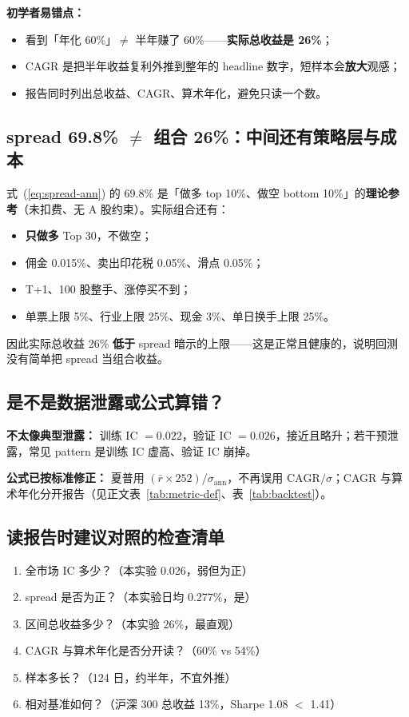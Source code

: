 \documentclass[UTF8,a4paper,12pt]{ctexart}
\begin{document}
\textbf{初学者易错点：}
\begin{itemize}[leftmargin=2em]
  \item 看到「年化 60\%」$\neq$ 半年赚了 60\%——\textbf{实际总收益是 26\%}；
  \item CAGR 是把半年收益复利外推到整年的 headline 数字，短样本会\textbf{放大}观感；
  \item 报告同时列出总收益、CAGR、算术年化，避免只读一个数。
\end{itemize}

\subsection{spread 69.8\% $\neq$ 组合 26\%：中间还有策略层与成本}

式~(\ref{eq:spread-ann}) 的 69.8\% 是「做多 top 10\%、做空 bottom 10\%」的\textbf{理论参考}（未扣费、无 A 股约束）。实际组合还有：

\begin{itemize}[leftmargin=2em]
  \item \textbf{只做多} Top 30，不做空；
  \item 佣金 0.015\%、卖出印花税 0.05\%、滑点 0.05\%；
  \item T+1、100 股整手、涨停买不到；
  \item 单票上限 5\%、行业上限 25\%、现金 3\%、单日换手上限 25\%。
\end{itemize}

因此实际总收益 26\% \textbf{低于} spread 暗示的上限——这是正常且健康的，说明回测没有简单把 spread 当组合收益。

\subsection{是不是数据泄露或公式算错？}

\textbf{不太像典型泄露：} 训练 IC $=0.022$，验证 IC $=0.026$，接近且略升；若干预泄露，常见 pattern 是训练 IC 虚高、验证 IC 崩掉。

\textbf{公式已按标准修正：} 夏普用 $(\bar{r}\times 252)/\sigma_{\mathrm{ann}}$，不再误用 $\mathrm{CAGR}/\sigma$；CAGR 与算术年化分开报告（见正文表~\ref{tab:metric-def}、表~\ref{tab:backtest}）。

\subsection{读报告时建议对照的检查清单}

\begin{enumerate}[leftmargin=2em]
  \item 全市场 IC 多少？（本实验 0.026，弱但为正）
  \item spread 是否为正？（本实验日均 0.277\%，是）
  \item 区间总收益多少？（本实验 26\%，最直观）
  \item CAGR 与算术年化是否分开读？（60\% vs 54\%）
  \item 样本多长？（124 日，约半年，不宜外推）
  \item 相对基准如何？（沪深 300 总收益 13\%，Sharpe 1.08 $<$ 1.41）
\end{enumerate}
\end{document}
